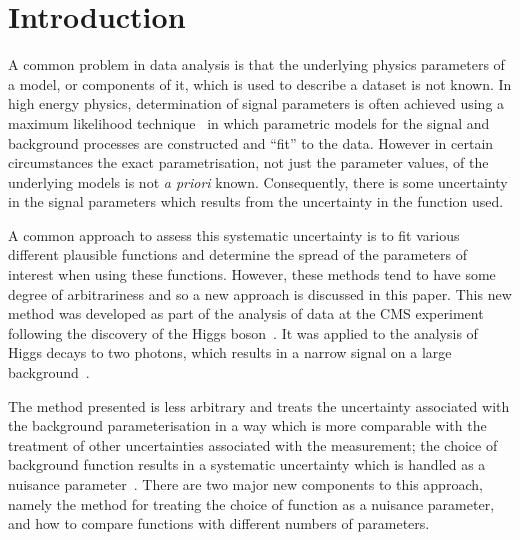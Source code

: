 \section{Introduction} %
\label{sec:introduction}


A common problem in data analysis is that the underlying physics parameters of a model, or components of it, which is used to describe a dataset
is not known. In high energy physics, determination of signal parameters is
often achieved using a maximum likelihood technique~\cite{ref:Fisher01011922}
in which parametric models for the signal and background processes are constructed and
``fit'' to the data. However in certain circumstances the exact parametrisation, not just the parameter
values, of the underlying models is not {\it a priori} known. Consequently, there is some uncertainty in the signal parameters which results from the uncertainty in the function used.

A common approach to assess this systematic uncertainty is to fit various different plausible functions and
determine the spread of the parameters of interest when using these functions.
However, these methods tend to have some degree of arbitrariness and so
a new approach is discussed in this paper.
This new method was developed as part of the analysis of data at the CMS experiment
following the discovery of the Higgs
boson~\cite{ref:introduction:atlasdis,ref:introduction:cmsdis}.
It was applied to the analysis of Higgs decays to two photons, which
results in a narrow signal on a large
background~\cite{ref:introduction:legacy}.

The method presented is less
arbitrary and treats the uncertainty associated with the
background parameterisation in a way
which is more comparable with the treatment of other
uncertainties associated with the measurement; the choice of background
function results in a systematic uncertainty
which is handled as a nuisance parameter~\cite{ref:intro:nusiances}.
There are two major new components to this approach, namely the method for
treating the choice of function as a nuisance parameter, and how to compare
functions with different numbers of parameters.

